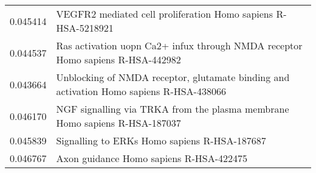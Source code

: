 \begin{longtable}{p{2.4cm}p{14.5cm}}
                 0.045414 &                            VEGFR2 mediated cell proliferation Homo sapiens R-HSA-5218921 \\
                 0.044537 &           Ras activation uopn Ca2+ infux through NMDA receptor Homo sapiens R-HSA-442982 \\
                 0.043664 &  Unblocking of NMDA receptor, glutamate binding and activation Homo sapiens R-HSA-438066 \\
                 0.046170 &               NGF signalling via TRKA from the plasma membrane Homo sapiens R-HSA-187037 \\
                 0.045839 &                                             Signalling to ERKs Homo sapiens R-HSA-187687 \\
                 0.046767 &                                                  Axon guidance Homo sapiens R-HSA-422475 \\
\end{longtable}


